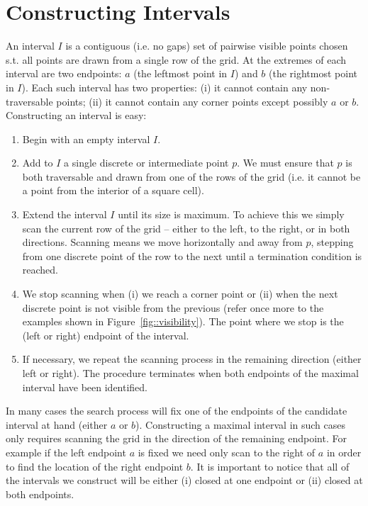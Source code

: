 \section{Constructing Intervals}
\label{sec::intervals}
An interval $I$ is a contiguous (i.e. no gaps) set of pairwise visible points
chosen s.t. all points are drawn from a single row of the grid.
At the extremes of each interval are two endpoints: $a$ (the leftmost point in $I$) 
and $b$ (the rightmost point in $I$).
Each such interval has two properties:
(i) it cannot contain any non-traversable points; (ii)
it cannot contain any corner points except possibly $a$ or $b$.  
Constructing an interval is easy: 
\begin{enumerate}
\item Begin with an empty interval $I$.
\item Add to $I$ a single discrete or intermediate point $p$. We must ensure
that $p$ is both traversable and drawn from one of the rows of the grid
(i.e. it cannot be a point from the interior of a square cell).
\item Extend the interval $I$ until its size is maximum. To achieve this we
 simply scan the current row of the grid -- either to the left, to the right,
or in both directions. Scanning means we move horizontally and away from $p$, 
stepping from one discrete point of the row to the next until a termination 
condition is reached.
\item We stop scanning when (i) we reach a corner point or (ii) when the next
discrete point is not visible from the previous (refer once more to
the examples shown in Figure~\ref{fig::visibility}).
The point where we stop is the (left or right) endpoint of the 
interval. 
\item If necessary, we repeat the scanning process in the remaining direction
(either left or right).
The procedure terminates when both endpoints of the maximal interval have been 
identified.
\end{enumerate}

In many cases the search process will fix one of the endpoints of the candidate interval 
at hand (either $a$ or $b$). Constructing a maximal interval in such cases only requires 
scanning the grid in the direction of the remaining endpoint. For example if the left 
endpoint $a$ is fixed we need only scan to the right of $a$ in order to find the location 
of the right endpoint $b$.
It is important to notice that all of the intervals we construct will be either (i) 
closed at one endpoint or (ii) closed at both endpoints. 
